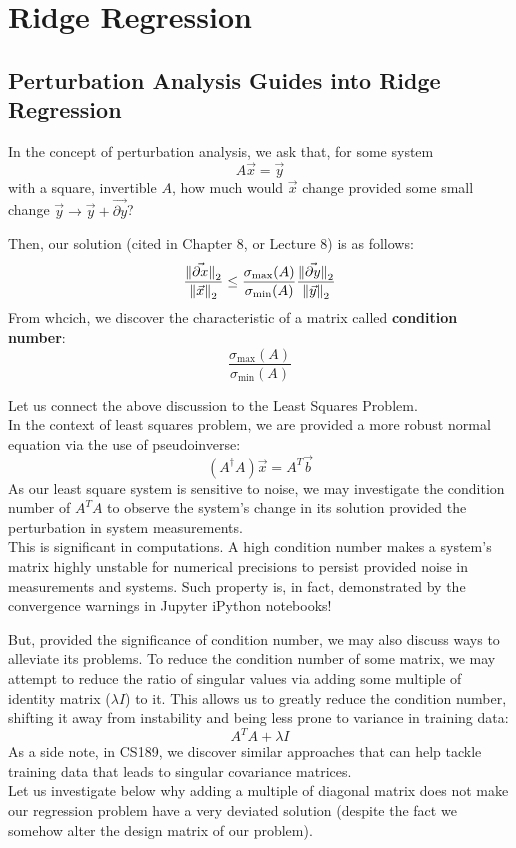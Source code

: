 \chapter{Ridge Regression}

\section{Perturbation Analysis Guides into Ridge Regression}
In the concept of perturbation analysis, we ask that, for some system
\[A \vec{x} = \vec{y}\]
with a square, invertible $A$, how much would $\vec{x}$ change provided some small change $\vec{y} \rightarrow \vec{y} + \vec{\partial y}$?

Then, our solution (cited in Chapter 8, or Lecture 8) is as follows:
\[
    \frac{{\| \vec{\partial x} \|}_{2}^{}}{{\| \vec{x} \|}_{2}^{}} \leq \frac{\sigma_{\max}(A)}{\sigma_{\min}(A)} \frac{{\| \vec{\partial y} \|}_{2}^{}}{{\| \vec{y} \|}_{2}^{}}
\]
From whcich, we discover the characteristic of a matrix called \textbf{condition number}:
\[\frac{\sigma_{\max}(A)}{\sigma_{\min}(A)}\]

Let us connect the above discussion to the Least Squares Problem. \\
In the context of least squares problem, we are provided a more robust normal equation via the use of pseudoinverse:
\[
    (A^\dagger A) \vec{x} = A^T \vec{b}
\]
As our least square system is sensitive to noise, we may investigate the condition number of $A^T A$ to observe the system's change in its solution provided the perturbation in system measurements. \\
This is significant in computations. A high condition number makes a system's matrix highly unstable for numerical precisions to persist provided noise in measurements and systems.
Such property is, in fact, demonstrated by the convergence warnings in Jupyter iPython notebooks!
\par
But, provided the significance of condition number, we may also discuss ways to alleviate its problems.
To reduce the condition number of some matrix, we may attempt to reduce the ratio of singular values via adding some multiple of identity matrix ($\lambda I$) to it.
This allows us to greatly reduce the condition number, shifting it away from instability and being less prone to variance in training data:
\[A^T A + \lambda I\]
As a side note, in CS189, we discover similar approaches that can help tackle training data that leads to singular covariance matrices. \\
Let us investigate below why adding a multiple of diagonal matrix does not make our regression problem have a very deviated solution (despite the fact we somehow alter the design matrix of our problem).

